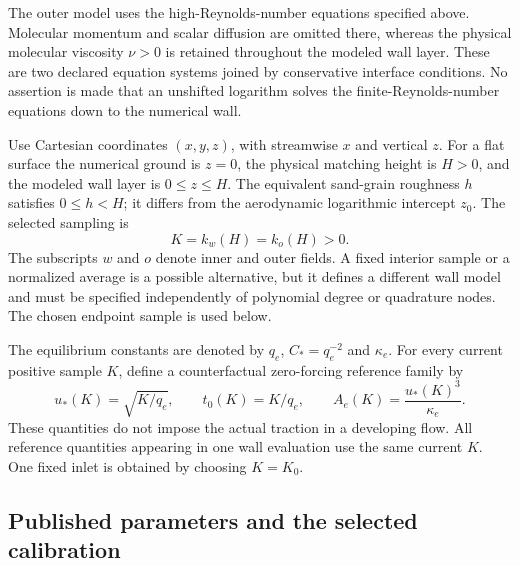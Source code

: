 \documentclass[11pt,a4paper]{article}
\numberwithin{equation}{section}
\begin{document}
The outer model uses the high-Reynolds-number equations specified above.
Molecular momentum and scalar diffusion are omitted there, whereas the
physical molecular viscosity $\nu>0$ is retained throughout the modeled
wall layer. These are two declared equation systems joined by conservative
interface conditions. No assertion is made that an unshifted logarithm
solves the finite-Reynolds-number equations down to the numerical wall.

Use Cartesian coordinates $(x,y,z)$, with streamwise $x$ and vertical $z$.
For a flat surface the numerical ground is $z=0$, the physical matching
height is $H>0$, and the modeled wall layer is $0\leq z\leq H$.
The equivalent sand-grain roughness $h$ satisfies $0\leq h<H$; it differs
from the aerodynamic logarithmic intercept $z_0$. The selected sampling is
\begin{equation}
 K=k_w(H)=k_o(H)>0.
 \label{eq:wj-wall-K}
\end{equation}
The subscripts $w$ and $o$ denote inner and outer fields. A fixed interior
sample or a normalized average is a possible alternative, but it defines
a different wall model and must be specified independently of polynomial
degree or quadrature nodes. The chosen endpoint sample is used below.

The equilibrium constants are denoted by $q_e$, $C_*=q_e^{-2}$ and
$\kappa_e$. For every current positive sample $K$, define a counterfactual
zero-forcing reference family by
\begin{equation}
 u_*(K)=\sqrt{K/q_e},\qquad t_0(K)=K/q_e,\qquad
 A_e(K)=\frac{u_*(K)^3}{\kappa_e}.
 \label{eq:wj-wall-ref-scales}
\end{equation}
These quantities do not impose the actual traction in a developing flow.
All reference quantities appearing in one wall evaluation use the same
current $K$. One fixed inlet is obtained by choosing $K=K_0$.

\subsection{Published parameters and the selected calibration}
\end{document}
